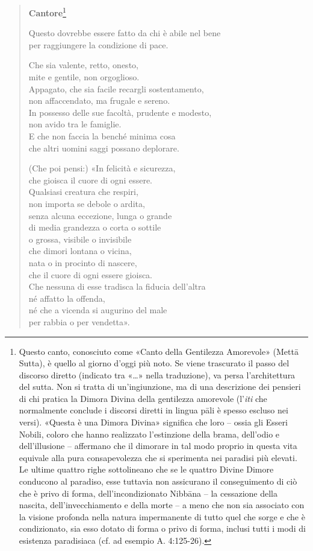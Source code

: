 \begin{quote}
\label{pag200b}\textbf{Cantore}\footnote{Questo canto, conosciuto come «Canto della Gentilezza Amorevole» (Mettā Sutta), è quello al giorno d’oggi più noto. Se viene trascurato il passo del discorso diretto (indicato tra «…» nella traduzione), va persa l’architettura del sutta. Non si tratta di un’ingiunzione, ma di una descrizione dei pensieri di chi pratica la Dimora Divina della gentilezza amorevole (l’\emph{iti} che normalmente conclude i discorsi diretti in lingua pāli è spesso escluso nei versi). «Questa è una Dimora Divina» significa che loro – ossia gli Esseri Nobili, coloro che hanno realizzato l’estinzione della brama, dell’odio e dell’illusione – affermano che il dimorare in tal modo proprio in questa vita equivale alla pura consapevolezza che si sperimenta nei paradisi più elevati. Le ultime quattro righe sottolineano che se le quattro Divine Dimore conducono al paradiso, esse tuttavia non assicurano il conseguimento di ciò che è privo di forma, dell’incondizionato Nibbāna – la cessazione della nascita, dell’invecchiamento e della morte – a meno che non sia associato con la visione profonda nella natura impermanente di tutto quel che sorge e che è condizionato, sia esso dotato di forma o privo di forma, inclusi tutti i modi di esistenza paradisiaca (cf. ad esempio A. 4:125-26).}


\label{pag200}Questo dovrebbe essere fatto da chi è abile nel bene \\
per raggiungere la condizione di pace.


Che sia valente, retto, onesto, \\
mite e gentile, non orgoglioso. \\
Appagato, che sia facile recargli sostentamento, \\
non affaccendato, ma frugale e sereno. \\
In possesso delle sue facoltà, prudente e modesto, \\
non avido tra le famiglie. \\
E che non faccia la benché minima cosa \\
che altri uomini saggi possano deplorare.


(Che poi pensi:) «In felicità e sicurezza, \\
che gioisca il cuore di ogni essere. \\
Qualsiasi creatura che respiri, \\
non importa se debole o ardita, \\
senza alcuna eccezione, lunga o grande \\
di media grandezza o corta o sottile \\
o grossa, visibile o invisibile \\
che dimori lontana o vicina, \\
nata o in procinto di nascere, \\
che il cuore di ogni essere gioisca. \\
Che nessuna di esse tradisca la fiducia dell’altra \\
né affatto la offenda, \\
né che a vicenda si augurino del male \\
per rabbia o per vendetta».



\end{quote}
